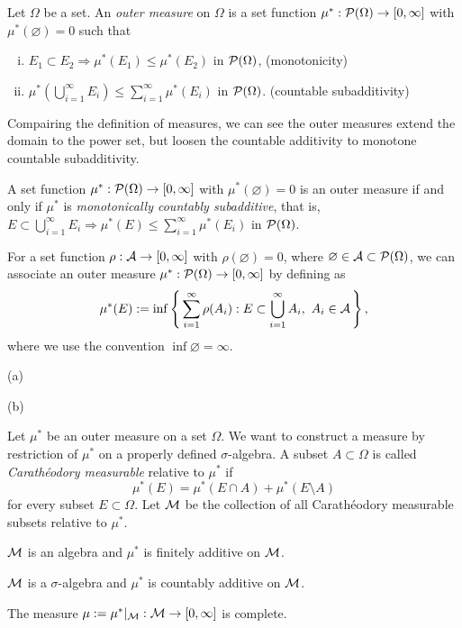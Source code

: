 \documentclass{../note}
\begin{document}
\begin{prb}
Let $\Omega$ be a set.
An \emph{outer measure} on $\Omega$ is a set function $\mu^*:\mathcal{P}(\Omega)\to[0,\infty]$ with $\mu^*(\varnothing)=0$ such that
\begin{enumerate}[(i)]
\item $E_1\subset E_2\Rightarrow\mu^*(E_1)\le\mu^*(E_2)$ in $\mathcal{P}(\Omega)$,
\hfill(monotonicity)
\item $\mu^*(\bigcup_{i=1}^\infty E_i)\le\sum_{i=1}^\infty\mu^*(E_i)$ in $\mathcal{P}(\Omega)$.
\hfill(countable subadditivity)
\end{enumerate}
Compairing the definition of measures, we can see the outer measures extend the domain to the power set, but loosen the countable additivity to monotone countable subadditivity.
\begin{parts}
\item A set function $\mu^*:\mathcal{P}(\Omega)\to[0,\infty]$ with $\mu^*(\varnothing)=0$ is an outer measure if and only if $\mu^*$ is \emph{monotonically countably subadditive}, that is, $E\subset\bigcup_{i=1}^\infty E_i\Rightarrow\mu^*(E)\le\sum_{i=1}^\infty\mu^*(E_i)$ in $\mathcal{P}(\Omega)$.
\item
For a set function $\rho:\mathcal{A}\to[0,\infty]$ with $\rho(\varnothing)=0$, where $\varnothing\in\mathcal{A}\subset\mathcal{P}(\Omega)$, we can associate an outer measure $\mu^*:\mathcal{P}(\Omega)\to[0,\infty]$ by defining as
\[\mu^*(E):=\inf\left\{\,\sum_{i=1}^\infty\rho(A_i):E\subset\bigcup_{i=1}^\infty A_i,\ A_i\in\mathcal{A}\,\right\},\]
where we use the convention $\inf\varnothing=\infty$.
\end{parts}
\end{prb}
\begin{pf}
(a)


(b)


\end{pf}

\begin{prb}
Let $\mu^*$ be an outer measure on a set $\Omega$.
We want to construct a measure by restriction of $\mu^*$ on a properly defined $\sigma$-algebra.
A subset $A\subset \Omega$ is called \emph{Carath\'eodory measurable} relative to $\mu^*$ if
\[\mu^*(E)=\mu^*(E\cap A)+\mu^*(E\setminus A)\]
for every subset $E\subset\Omega$.
Let $\mathcal{M}$ be the collection of all Carath\'eodory measurable subsets relative to $\mu^*$.
\begin{parts}
\item $\mathcal{M}$ is an algebra and $\mu^*$ is finitely additive on $\mathcal{M}$.
\item $\mathcal{M}$ is a $\sigma$-algebra and $\mu^*$ is countably additive on $\mathcal{M}$.
\item The measure $\mu:=\mu^*|_{\mathcal{M}}:\mathcal{M}\to[0,\infty]$ is complete.
\end{parts}
\end{prb}
\begin{pf}

\end{pf}
\end{document}
